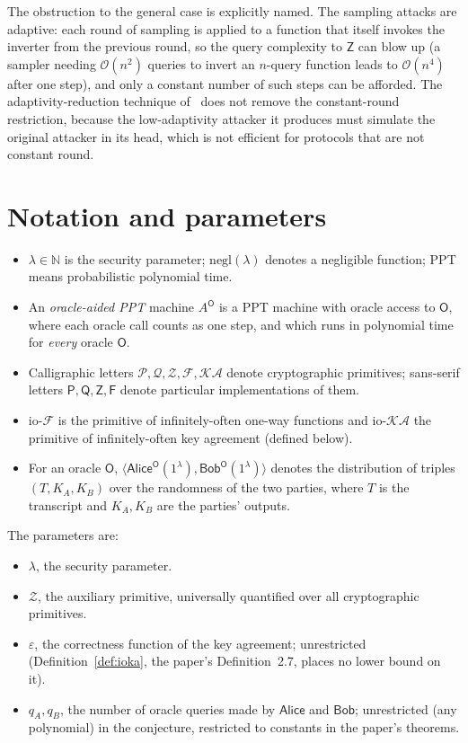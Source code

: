 \documentclass{conjura-conjecture}
\newcommand{\negl}{\mathrm{negl}}
\newcommand{\iopref}{\mathrm{io}\text{-}}
\newcommand{\Fc}{\mathcal{F}}
\newcommand{\KAc}{\mathcal{KA}}
\newcommand{\ioF}{\iopref\Fc}
\newcommand{\ioKA}{\iopref\KAc}
\newcommand{\Zc}{\mathcal{Z}}
\newcommand{\Pc}{\mathcal{P}}
\newcommand{\Qc}{\mathcal{Q}}
\newcommand{\Oc}{\mathsf{O}}
\newcommand{\Fs}{\mathsf{F}}
\newcommand{\Ps}{\mathsf{P}}
\newcommand{\Qs}{\mathsf{Q}}
\newcommand{\Zs}{\mathsf{Z}}
\newcommand{\Alice}{\mathsf{Alice}}
\newcommand{\Bob}{\mathsf{Bob}}
\newcommand{\kaexec}{\langle\Alice^{\Oc}(1^{\lambda}),\Bob^{\Oc}(1^{\lambda})\rangle}
\begin{document}
The obstruction to the general case is explicitly named. The sampling
attacks are adaptive: each round of sampling is applied to a function
that itself invokes the inverter from the previous round, so the query
complexity to $\Zs$ can blow up (a sampler needing $\mathcal O(n^2)$
queries to invert an $n$-query function leads to $\mathcal O(n^4)$ after
one step), and only a constant number of such steps can be afforded. The
adaptivity-reduction technique of~\cite{MMV11} does not remove the
constant-round restriction, because the low-adaptivity attacker it
produces must simulate the original attacker in its head, which is not
efficient for protocols that are not constant round.

\section{Notation and parameters}\label{sec:notation}

\begin{itemize}
\item $\lambda\in\mathbb{N}$ is the security parameter; $\negl(\lambda)$
  denotes a negligible function; PPT means probabilistic polynomial time.
\item An \emph{oracle-aided PPT} machine $A^{\Oc}$ is a PPT machine with
  oracle access to $\Oc$, where each oracle call counts as one step, and
  which runs in polynomial time for \emph{every} oracle $\Oc$.
\item Calligraphic letters $\Pc,\Qc,\Zc,\Fc,\KAc$ denote cryptographic
  primitives; sans-serif letters $\Ps,\Qs,\Zs,\Fs$ denote particular
  implementations of them.
\item $\ioF$ is the primitive of infinitely-often one-way functions and
  $\ioKA$ the primitive of infinitely-often key agreement (defined
  below).
\item For an oracle $\Oc$, $\kaexec$ denotes the distribution of triples
  $(T,K_A,K_B)$ over the randomness of the two parties, where $T$ is the
  transcript and $K_A,K_B$ are the parties' outputs.
\end{itemize}

The parameters are:
\begin{itemize}
\item $\lambda$, the security parameter.
\item $\Zc$, the auxiliary primitive, universally quantified over all
  cryptographic primitives.
\item $\varepsilon$, the correctness function of the key agreement;
  unrestricted (Definition~\ref{def:ioka}, the paper's Definition~2.7,
  places no lower bound on it).
\item $q_A,q_B$, the number of oracle queries made by $\Alice$ and
  $\Bob$; unrestricted (any polynomial) in the conjecture, restricted to
  constants in the paper's theorems.
\end{itemize}
\end{document}
